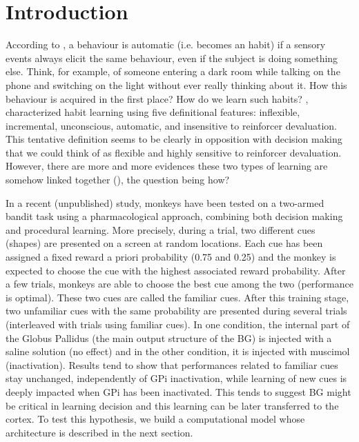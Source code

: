 \section{Introduction}

According to \citet{Schneider:1977}, a behaviour is automatic (i.e. becomes an
habit) if a sensory events always elicit the same behaviour, even if the
subject is doing something else. Think, for example, of someone entering a dark
room while talking on the phone and switching on the light without ever really
thinking about it. How this behaviour is acquired in the first place? How do we
learn such habits? \citet{Seger:2011}, characterized habit learning using five
definitional features: inflexible, incremental, unconscious, automatic, and
insensitive to reinforcer devaluation. This tentative definition seems to be
clearly in opposition with decision making that we could think of as flexible
and highly sensitive to reinforcer devaluation. However, there are more and
more evidences these two types of learning are somehow linked together
(\citet{Yin:2006}), the question being how?

In a recent (unpublished) study, monkeys have been tested on a two-armed bandit
task using a pharmacological approach, combining both decision making and
procedural learning. More precisely, during a trial, two different cues
(shapes) are presented on a screen at random locations. Each cue has been
assigned a fixed reward a priori probability (0.75 and 0.25) and the monkey is
expected to choose the cue with the highest associated reward probability.
After a few trials, monkeys are able to choose the best cue among the two
(performance is optimal). These two cues are called the familiar cues. After
this training stage, two unfamiliar cues with the same probability are
presented during several trials (interleaved with trials using familiar
cues). In one condition, the internal part of the Globus Pallidus (the main
output structure of the BG) is injected with a saline solution (no effect) and
in the other condition, it is injected with muscimol (inactivation). Results
tend to show that performances related to familiar cues stay unchanged,
independently of GPi inactivation, while learning of new cues is deeply
impacted when GPi has been inactivated. This tends to suggest BG might be
critical in learning decision and this learning can be later transferred to the
cortex. To test this hypothesis, we build a computational model whose
architecture is described in the next section.



